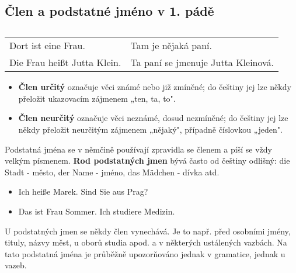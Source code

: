   \subsection*{Člen a podstatné jméno v 1. pádě}
    \begin{table}[ht!]   %
      \begin{tabular}{ll}
        Dort ist eine Frau.          & Tam je nějaká paní. \\
        Die Frau heißt Jutta Klein.  & Ta paní se jmenuje Jutta Kleinová.   \\
      \end{tabular}
      \caption*{ }
    \end{table}
    \begin{itemize}[noitemsep]
      \item \textbf{Člen určitý} označuje věci známé nebo již zmíněné; do češtiny jej lze někdy 
            přeložit ukazovacím zájmenem „ten, ta, to".
      \item \textbf{Člen neurčitý} označuje věci neznámé, dosud nezmíněné; do češtiny jej lze 
            někdy přeložit neurčitým zájmenem „nějaký", případně číslovkou „jeden".
    \end{itemize}

    Podstatná jména se v němčině používají zpravidla se členem a píší se vždy velkým písmenem. 
    \textbf{Rod podstatných jmen} bývá často od češtiny odlišný: die Stadt - město, der Name - 
    jméno, das M{\"a}dchen - dívka atd.
    \begin{itemize}[noitemsep] %
      \item Ich heiße Marek. Sind Sie aus Prag?
      \item Das ist Frau Sommer. Ich studiere Medizin.
    \end{itemize}
    U podstatných jmen se někdy člen vynechává. Je to např. před osobními jmény, tituly, názvy 
    měst, u oborů studia apod. a v některých ustálených vazbách. Na tato podstatná jména je 
    průběžně upozorňováno jednak v gramatice, jednak u vazeb.

